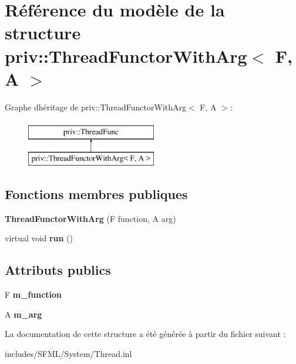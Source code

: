 \hypertarget{structpriv_1_1ThreadFunctorWithArg}{}\section{Référence du modèle de la structure priv\+:\+:Thread\+Functor\+With\+Arg$<$ F, A $>$}
\label{structpriv_1_1ThreadFunctorWithArg}
Graphe d\textquotesingle{}héritage de priv\+:\+:Thread\+Functor\+With\+Arg$<$ F, A $>$\+:\begin{figure}[H]
\begin{center}
\leavevmode
\includegraphics[height=2.000000cm]{structpriv_1_1ThreadFunctorWithArg}
\end{center}
\end{figure}
\subsection*{Fonctions membres publiques}
\begin{DoxyCompactItemize}
\item 
\mbox{\label{structpriv_1_1ThreadFunctorWithArg_ae3745753b77880cdfda6f10d72748efa}} 
{\bfseries Thread\+Functor\+With\+Arg} (F function, A arg)
\item 
\mbox{\label{structpriv_1_1ThreadFunctorWithArg_a0f8bb6ba36819e80016528bab8b0bd4f}} 
virtual void {\bfseries run} ()
\end{DoxyCompactItemize}
\subsection*{Attributs publics}
\begin{DoxyCompactItemize}
\item 
\mbox{\label{structpriv_1_1ThreadFunctorWithArg_ab12992af3112f15df4b6f0dbce3137b9}} 
F {\bfseries m\+\_\+function}
\item 
\mbox{\label{structpriv_1_1ThreadFunctorWithArg_ac598f7701f976320bc3964733b9ae9ae}} 
A {\bfseries m\+\_\+arg}
\end{DoxyCompactItemize}


La documentation de cette structure a été générée à partir du fichier suivant \+:\begin{DoxyCompactItemize}
\item 
includes/\+S\+F\+M\+L/\+System/Thread.\+inl\end{DoxyCompactItemize}
